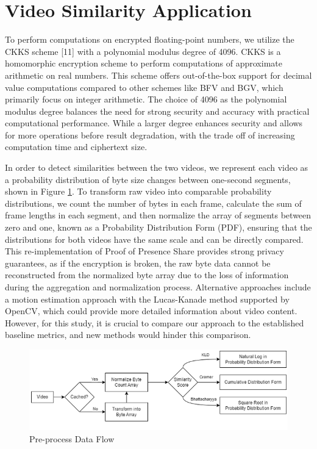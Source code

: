 \section{Video Similarity Application}
To perform computations on encrypted floating-point numbers, we utilize the CKKS scheme [11] with a polynomial modulus degree of 4096. CKKS is a homomorphic encryption scheme to perform computations of approximate arithmetic on real numbers. This scheme offers out-of-the-box support for decimal value computations compared to other schemes like BFV and BGV, which primarily focus on integer arithmetic. The choice of 4096 as the polynomial modulus degree balances the need for strong security and accuracy with practical computational performance. While a larger degree enhances security and allows for more operations before result degradation, with the trade off of increasing computation time and ciphertext size.

In order to detect similarities between the two videos, we represent each video as a probability distribution of byte size changes between one-second segments, shown in Figure \ref{fig:preprocess-data-flow}. To transform raw video into comparable probability distributions, we count the number of bytes in each frame, calculate the sum of frame lengths in each segment, and then normalize the array of segments between zero and one, known as a Probability Distribution Form (PDF), ensuring that the distributions for both videos have the same scale and can be directly compared. This re-implementation of Proof of Presence Share \cite{Lagesse2021-PopShare} provides strong privacy guarantees, as if the encryption is broken, the raw byte data cannot be reconstructed from the normalized byte array due to the loss of information during the aggregation and normalization process. Alternative approaches include a motion estimation approach with the Lucas-Kanade method \cite{Lucas1981-uy} supported by OpenCV, which could provide more detailed information about video content. However, for this study, it is crucial to compare our approach to the established baseline metrics, and new methods would hinder this comparison.

\begin{figure}[t]
    \centering
    \includegraphics[width=\textwidth]{4 Design/4.3 Preprocess Data Flow.png}
    \caption{Pre-process Data Flow}
    \label{fig:preprocess-data-flow}
\end{figure}

